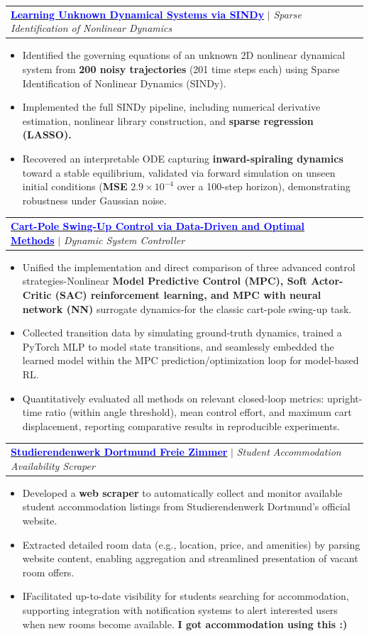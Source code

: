 \documentclass[letterpaper,11pt]{article}
\makeatletter
\newcommand{\resumeItem}[1]{
  \item\small{
    {#1 \vspace{-2pt}}
  }
}
\newcommand{\resumeProjectHeading}[2]{
    \item
    \begin{tabular*}{0.97\textwidth}{l@{\extracolsep{\fill}}r}
      \small#1 & #2 \\
    \end{tabular*}\vspace{-7pt}
}
\newcommand{\resumeItemListStart}{\begin{itemize}}
\newcommand{\resumeItemListEnd}{\end{itemize}\vspace{-5pt}}
\makeatother
\begin{document}
\resumeProjectHeading{
\textbf{\href{https://github.com/NimeshBhavsar/DS4DS-Unknown-Ordinary-Differential-Equation}{\textcolor{blue}{Learning Unknown Dynamical Systems via SINDy}}} 
$|$ \emph{Sparse Identification of Nonlinear Dynamics}
}{}
\vspace{2pt}
\resumeItemListStart
  \resumeItem{Identified the governing equations of an unknown 2D nonlinear dynamical system from \textbf{200 noisy trajectories} (201 time steps each) using Sparse Identification of Nonlinear Dynamics (SINDy).}
  \resumeItem{Implemented the full SINDy pipeline, including numerical derivative estimation, nonlinear library construction, and \textbf{sparse regression (LASSO).}}
  \resumeItem{Recovered an interpretable ODE capturing \textbf{inward-spiraling dynamics} toward a stable equilibrium, validated via forward simulation on unseen initial conditions (\textbf{MSE} $2.9 \times 10^{-4}$ over a 100-step horizon), demonstrating robustness under Gaussian noise.}
\resumeItemListEnd


\resumeProjectHeading{
\textbf{\href{https://github.com/NimeshBhavsar/Cart-Pole-Dynamics/}{\textcolor{blue}{Cart-Pole Swing-Up Control via Data-Driven and Optimal Methods}}} 
$|$ \emph{Dynamic System Controller }
}{}
\vspace{2pt}
\resumeItemListStart
  \resumeItem{Unified the implementation and direct comparison of three advanced control strategies-Nonlinear \textbf{Model Predictive Control (MPC), Soft Actor-Critic (SAC) reinforcement learning, and MPC with neural network (NN)} surrogate dynamics-for the classic cart-pole swing-up task.}
  \resumeItem{Collected transition data by simulating ground-truth dynamics, trained a PyTorch MLP to model state transitions, and seamlessly embedded the learned model within the MPC prediction/optimization loop for model-based RL.}
  \resumeItem{Quantitatively evaluated all methods on relevant closed-loop metrics: upright-time ratio (within angle threshold), mean control effort, and maximum cart displacement, reporting comparative results in reproducible experiments.}
\resumeItemListEnd

\resumeProjectHeading{
\textbf{\href{https://github.com/NimeshBhavsar/Studierendenwerk-Dortmund-Freie-Zimmer}{\textcolor{blue}{Studierendenwerk Dortmund Freie Zimmer}}} 
$|$ \emph{Student Accommodation Availability Scraper}
}{}
\vspace{2pt}
\resumeItemListStart
  \resumeItem{Developed a \textbf{web scraper} to automatically collect and monitor available student accommodation listings from Studierendenwerk Dortmund’s official website.}
  \resumeItem{Extracted detailed room data (e.g., location, price, and amenities) by parsing website content, enabling aggregation and streamlined presentation of vacant room offers.}
  \resumeItem{IFacilitated up-to-date visibility for students searching for accommodation, supporting integration with notification systems to alert interested users when new rooms become available. \textbf{I got accommodation using this :)} }
\resumeItemListEnd
\end{document}
